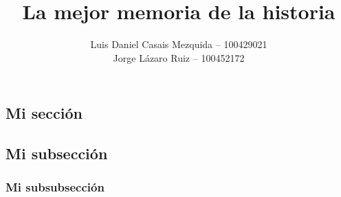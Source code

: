 \documentclass[es]{uc3mreport}
\author{
    Luis Daniel Casais Mezquida -- 100429021\\
    Jorge Lázaro Ruiz -- 100452172
}
\title{La mejor memoria de la historia}
\begin{document}
    \makecover

    \tableofcontents

    \begin{report}
        \section{Mi sección}
        \lipsum[1]

        \subsection{Mi subsección}
        \lipsum[2-4]

        \subsubsection{Mi subsubsección}
        \lipsum[2-4]
    \end{report}
\end{document}

